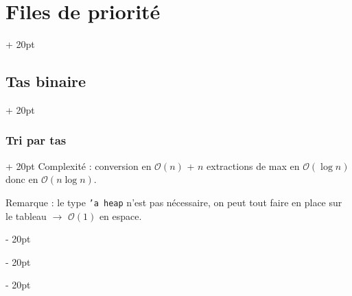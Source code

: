 \documentclass[a4paper, 12pt, twoside]{article}
\newcommand{\ind}[1][20pt]{\advance\leftskip + #1}
\newcommand{\deind}[1][20pt]{\advance\leftskip - #1}
\newenvironment{indt}[2][20pt]{#2 \par \ind[#1]}{\par \deind} %
\begin{document}
\begin{indt}{\section{Files de priorité}}
\begin{indt}{\subsection{Tas binaire}}
\begin{indt}{\subsubsection{Tri par tas}}
                Complexité : conversion en $\mathcal O(n)$ + $n$ extractions de max en $\mathcal O(\log n)$ donc en $\mathcal O(n\log n)$.
                
                Remarque : le type \texttt{'a heap} n'est pas nécessaire, on peut tout faire en place sur le tableau $\rightarrow$ $\mathcal O(1)$ en espace.
            \end{indt}
        \end{indt}
        
    \end{indt}
    
    
    
\end{document}
